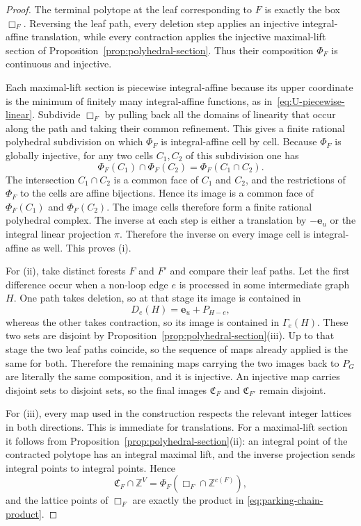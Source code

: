 \documentclass[11pt]{article}
\theoremstyle{plain}
\theoremstyle{definition}
\newcommand{\fC}{\mathfrak C}    %
\newcommand{\be}{\mathbf{e}}
\newcommand{\ZZ}{\mathbb Z}
\numberwithin{equation}{section}
\begin{document}
\begin{proof}
The terminal polytope at the leaf corresponding to $F$ is exactly the box
$\Box_F$.  Reversing the leaf path, every deletion step applies an injective
integral-affine translation, while every contraction applies the injective maximal-lift section of Proposition~\ref{prop:polyhedral-section}.  Thus their
composition $\Phi_F$ is continuous and injective.

Each maximal-lift section is piecewise integral-affine because its upper coordinate
is the minimum of finitely many integral-affine functions, as in~\eqref{eq:U-piecewise-linear}.
Subdivide $\Box_F$ by pulling back all the domains of linearity that occur along the path
and taking their common refinement.
This gives a finite rational polyhedral subdivision on which $\Phi_F$ is integral-affine cell by cell.
Because $\Phi_F$ is globally injective, for any two cells $C_1,C_2$ of this subdivision one has
\[
   \Phi_F(C_1)\cap\Phi_F(C_2)=\Phi_F(C_1\cap C_2).
\]
The intersection $C_1\cap C_2$ is a common face of $C_1$ and $C_2$, and the restrictions
of $\Phi_F$ to the cells are affine bijections.
Hence its image is a common face of $\Phi_F(C_1)$ and $\Phi_F(C_2)$.
The image cells therefore form a finite rational polyhedral complex.
The inverse at each step is either a translation by $-\be_u$ or the integral linear projection $\pi$.
Therefore the inverse on every image cell is integral-affine as well.  This proves (i).

For (ii), take distinct forests $F$ and $F'$ and compare their leaf paths.
Let the first difference occur when a non-loop edge $e$ is processed in some intermediate graph $H$.
One path takes deletion, so at that stage its image is contained in
\[
   D_e(H)=\be_u+P_{H-e},
\]
whereas the other takes contraction, so its image is contained in
$\Gamma_e(H)$.  These two sets are disjoint by
Proposition~\ref{prop:polyhedral-section}(iii).  Up to that stage the two leaf
paths coincide, so the sequence of maps already applied is the same for both.
Therefore the remaining maps carrying the two images back to $P_G$ are
literally the same composition, and it is injective.
An injective map carries disjoint sets to disjoint sets, so the final images $\fC_F$ and $\fC_{F'}$ remain disjoint.

For (iii), every map used in the construction respects the relevant integer
lattices in both directions.  This is immediate for translations.  For a
maximal-lift section it follows from
Proposition~\ref{prop:polyhedral-section}(ii): an integral point of the
contracted polytope has an integral maximal lift, and the inverse projection
sends integral points to integral points.  Hence
\[
   \fC_F\cap\ZZ^V
   =\Phi_F(\Box_F\cap\ZZ^{c(F)}),
\]
and the lattice points of $\Box_F$ are exactly the product in
\eqref{eq:parking-chain-product}.


\end{proof}
\end{document}
